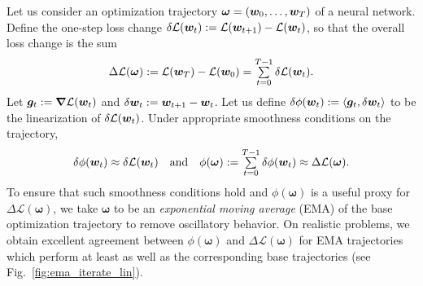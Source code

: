 \documentclass{article} %
\newcommand{\inner}[2]{\left\langle #1, #2 \right\rangle}
\newcommand{\loss}{\mathcal{L}}
\newcommand{\traj}{\bm{\omega}}
\begin{document}
Let us consider an optimization trajectory $\traj = (\bw_0, \ldots, \bw_T)$ of a neural network. Define the one-step loss change $\delta \loss(\bw_t) := \loss(\bw_{t+1}) - \loss(\bw_t)$, so that the overall loss change is the sum
\[
\Delta \loss(\traj) := \loss(\bw_T) - \loss(\bw_0) = \textstyle\sum\limits_{t=0}^{T-1} \delta \loss(\bw_t).
\]
Let $\bg_t := \grad \loss(\bw_t)$ and $\delta {\boldsymbol w}_t := {\boldsymbol w}_{t+1} - {\boldsymbol w}_t$. Let us define $\delta \phi(\bw_t) := \inner{\bg_t}{\delta \bw_t}$ to be the linearization of $\delta \loss(\bw_t)$. Under appropriate smoothness conditions on the trajectory,
\begin{equation}\label{eq:linear_defs}
    \delta \phi(\bw_t) \approx \delta \loss(\bw_t)
\text{ ~~and~~ } \phi(\traj) := \textstyle\sum\limits_{t=0}^{T-1} \delta \phi(\bw_t) \approx \Delta \loss(\traj).
\end{equation}
To ensure that such smoothness conditions hold and $\phi(\traj)$ is a useful proxy for $\Delta \loss(\traj)$, we take $\traj$ to be an \textit{exponential moving average} (EMA) of the base optimization trajectory to remove oscillatory behavior. On realistic problems, we obtain excellent agreement between $\phi(\traj)$ and $\Delta \loss(\traj)$ for EMA trajectories which perform at least as well as the corresponding base trajectories (see Fig.\ \ref{fig:ema_iterate_lin}). 
\end{document}
